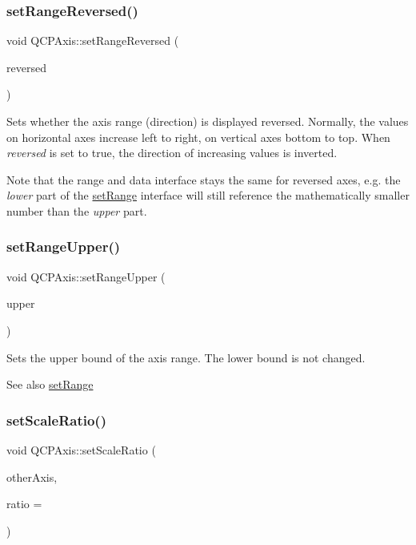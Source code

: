 \subsubsection{\texorpdfstring{set\+Range\+Reversed()}{setRangeReversed()}}
{\footnotesize\ttfamily void Q\+C\+P\+Axis\+::set\+Range\+Reversed (\begin{DoxyParamCaption}\item[{bool}]{reversed }\end{DoxyParamCaption})}

Sets whether the axis range (direction) is displayed reversed. Normally, the values on horizontal axes increase left to right, on vertical axes bottom to top. When {\itshape reversed} is set to true, the direction of increasing values is inverted.

Note that the range and data interface stays the same for reversed axes, e.\+g. the {\itshape lower} part of the \hyperlink{class_q_c_p_axis_aebdfea5d44c3a0ad2b4700cd4d25b641}{set\+Range} interface will still reference the mathematically smaller number than the {\itshape upper} part. \mbox{\label{class_q_c_p_axis_acd3ca1247aa867b540cd5ec30ccd3bef}} 
\subsubsection{\texorpdfstring{set\+Range\+Upper()}{setRangeUpper()}}
{\footnotesize\ttfamily void Q\+C\+P\+Axis\+::set\+Range\+Upper (\begin{DoxyParamCaption}\item[{double}]{upper }\end{DoxyParamCaption})}

Sets the upper bound of the axis range. The lower bound is not changed. \begin{DoxySeeAlso}{See also}
\hyperlink{class_q_c_p_axis_aebdfea5d44c3a0ad2b4700cd4d25b641}{set\+Range} 
\end{DoxySeeAlso}
\mbox{\label{class_q_c_p_axis_af4bbd446dcaee5a83ac30ce9bcd6e125}} 
\subsubsection{\texorpdfstring{set\+Scale\+Ratio()}{setScaleRatio()}}
{\footnotesize\ttfamily void Q\+C\+P\+Axis\+::set\+Scale\+Ratio (\begin{DoxyParamCaption}\item[{const \hyperlink{class_q_c_p_axis}{Q\+C\+P\+Axis} $\ast$}]{other\+Axis,  }\item[{double}]{ratio = {} }\end{DoxyParamCaption})}

